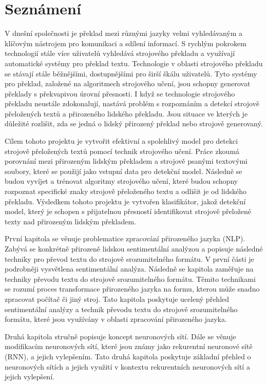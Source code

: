 \chapter{Seznámení}\label{sec:Introduction}
V dnešní společnosti je překlad mezi různými jazyky velmi vyhledávaným a klíčovým nástrojem pro komunikaci a sdílení informací.
S rychlým pokrokem technologií stále více uživatelů vyhledává strojového překladu a využívají automatické systémy pro překlad textu.
Technologie v oblasti strojového překladu se stávají stále běžnějšími, dostupnějšími pro širší škálu uživatelů.
Tyto systémy pro překlad, založené na algoritmech strojového učení, jsou schopny generovat překlady s překvapivou úrovní přesnosti.
I když se technologie strojového překladu neustále zdokonalují, nastává problém s rozpoznáním a detekcí strojově přeložených textů a přirozeného lidského překladu.
Jsou situace ve kterých je důležité rozlišit, zda se jedná o lidský přirozený překlad nebo strojově generovaný.

Cílem tohoto projektu je vytvořit efektivní a spolehlivý model pro detekci strojově přeložených textů pomocí technik strojového učení.
Práce zkoumá porovnání mezi přirozeným lidským překladem a strojově psanými textovými soubory, které se použijí jako vstupní data pro detekční model.
Následně se budou vyvíjet a trénovat algoritmy strojového učení, které budou schopny rozpoznat specifické znaky strojově přeloženého textu a odlišit je od lidského překladu.
Výsledkem tohoto projektu je vytvořen klasifikátor, jakož detekční model, který je schopen s přijatelnou přesností identifikovat strojově přeložené texty nad přirozeným lidským překladem.

První kapitola se věnuje problematice zpracování přirozeného jazyka (NLP).
Zabývá se konkrétně přirozeně lidskou sentimentální analýzou a popisuje následné techniky pro převod textu do strojově srozumitelného formátu.
V první části je podrobněji vysvětlena sentimentální analýza.
Následně se kapitola zaměřuje na techniky převodu textu do strojově srozumitelného formátu.
Těmito technikami se rozumí proces transformace přirozeného jazyka na formu, kterou může snadno zpracovat počítač či jiný stroj.
Tato kapitola poskytuje ucelený přehled sentimentální analýzy a technik převodu textu do strojově srozumitelného formátu, které jsou využívány v oblasti zpracování přirozeného jazyka.

Druhá kapitola stručně popisuje koncept neuronových sítí. Dále se věnuje modifikacím neuronových sítí, které jsou známy jako rekurentní neuronové sítě (RNN), a jejich vylepšením.
Tato druhá kapitola poskytuje základní přehled o neuronových sítích a jejich využití v kontextu rekurentních neuronových sítí a jejich vylepšení.

